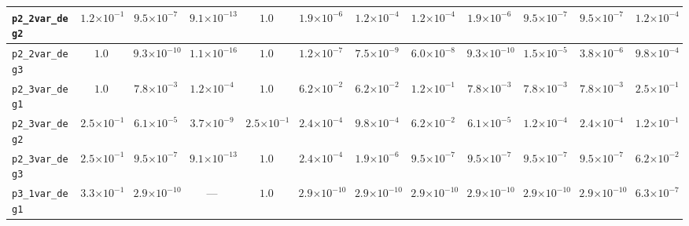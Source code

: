 \begin{landscape}
\begin{table}[H]
{\begin{tabular}{lccccccccccc}
\hline
\texttt{p2\_2var\_deg2} & $1.2{\scriptstyle\times 10^{-1}}$ & $9.5{\scriptstyle\times 10^{-7}}$ & \textbf{$9.1{\scriptstyle\times 10^{-13}}$} & $1.0$ & $1.9{\scriptstyle\times 10^{-6}}$ & $1.2{\scriptstyle\times 10^{-4}}$ & $1.2{\scriptstyle\times 10^{-4}}$ & $1.9{\scriptstyle\times 10^{-6}}$ & $9.5{\scriptstyle\times 10^{-7}}$ & $9.5{\scriptstyle\times 10^{-7}}$ & $1.2{\scriptstyle\times 10^{-4}}$ \\
\hline
\texttt{p2\_2var\_deg3} & $1.0$ & $9.3{\scriptstyle\times 10^{-10}}$ & \textbf{$1.1{\scriptstyle\times 10^{-16}}$} & $1.0$ & $1.2{\scriptstyle\times 10^{-7}}$ & $7.5{\scriptstyle\times 10^{-9}}$ & $6.0{\scriptstyle\times 10^{-8}}$ & $9.3{\scriptstyle\times 10^{-10}}$ & $1.5{\scriptstyle\times 10^{-5}}$ & $3.8{\scriptstyle\times 10^{-6}}$ & $9.8{\scriptstyle\times 10^{-4}}$ \\
\hline
\texttt{p2\_3var\_deg1} & $1.0$ & $7.8{\scriptstyle\times 10^{-3}}$ & \textbf{$1.2{\scriptstyle\times 10^{-4}}$} & $1.0$ & $6.2{\scriptstyle\times 10^{-2}}$ & $6.2{\scriptstyle\times 10^{-2}}$ & $1.2{\scriptstyle\times 10^{-1}}$ & $7.8{\scriptstyle\times 10^{-3}}$ & $7.8{\scriptstyle\times 10^{-3}}$ & $7.8{\scriptstyle\times 10^{-3}}$ & $2.5{\scriptstyle\times 10^{-1}}$ \\
\hline
\texttt{p2\_3var\_deg2} & $2.5{\scriptstyle\times 10^{-1}}$ & $6.1{\scriptstyle\times 10^{-5}}$ & \textbf{$3.7{\scriptstyle\times 10^{-9}}$} & $2.5{\scriptstyle\times 10^{-1}}$ & $2.4{\scriptstyle\times 10^{-4}}$ & $9.8{\scriptstyle\times 10^{-4}}$ & $6.2{\scriptstyle\times 10^{-2}}$ & $6.1{\scriptstyle\times 10^{-5}}$ & $1.2{\scriptstyle\times 10^{-4}}$ & $2.4{\scriptstyle\times 10^{-4}}$ & $1.2{\scriptstyle\times 10^{-1}}$ \\
\hline
\texttt{p2\_3var\_deg3} & $2.5{\scriptstyle\times 10^{-1}}$ & $9.5{\scriptstyle\times 10^{-7}}$ & \textbf{$9.1{\scriptstyle\times 10^{-13}}$} & $1.0$ & $2.4{\scriptstyle\times 10^{-4}}$ & $1.9{\scriptstyle\times 10^{-6}}$ & $9.5{\scriptstyle\times 10^{-7}}$ & $9.5{\scriptstyle\times 10^{-7}}$ & $9.5{\scriptstyle\times 10^{-7}}$ & $9.5{\scriptstyle\times 10^{-7}}$ & $6.2{\scriptstyle\times 10^{-2}}$ \\
\hline
\texttt{p3\_1var\_deg1} & $3.3{\scriptstyle\times 10^{-1}}$ & \textbf{$2.9{\scriptstyle\times 10^{-10}}$} & --- & $1.0$ & \textbf{$2.9{\scriptstyle\times 10^{-10}}$} & \textbf{$2.9{\scriptstyle\times 10^{-10}}$} & \textbf{$2.9{\scriptstyle\times 10^{-10}}$} & \textbf{$2.9{\scriptstyle\times 10^{-10}}$} & \textbf{$2.9{\scriptstyle\times 10^{-10}}$} & \textbf{$2.9{\scriptstyle\times 10^{-10}}$} & $6.3{\scriptstyle\times 10^{-7}}$ \\

\end{tabular}}
\end{table}
\end{landscape}
